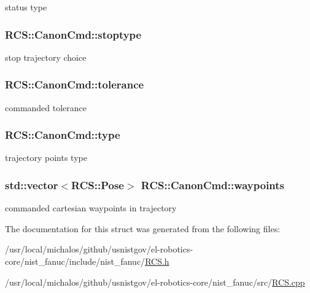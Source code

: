 status type \hypertarget{structRCS_1_1CanonCmd_a22bc418b884c7afabf0a2d3538f74cad}{
\subsubsection[{stoptype}]{ R\-C\-S\-::\-Canon\-Cmd\-::stoptype}}\label{structRCS_1_1CanonCmd_a22bc418b884c7afabf0a2d3538f74cad}
stop trajectory choice \hypertarget{structRCS_1_1CanonCmd_a0ae62df775329f52054c5cb25d0845a9}{
\subsubsection[{tolerance}]{ R\-C\-S\-::\-Canon\-Cmd\-::tolerance}}\label{structRCS_1_1CanonCmd_a0ae62df775329f52054c5cb25d0845a9}
commanded tolerance \hypertarget{structRCS_1_1CanonCmd_abf1d51c90a3f1b4c5796292c53cbde01}{
\subsubsection[{type}]{ R\-C\-S\-::\-Canon\-Cmd\-::type}}\label{structRCS_1_1CanonCmd_abf1d51c90a3f1b4c5796292c53cbde01}
trajectory points type \hypertarget{structRCS_1_1CanonCmd_a1f7fdffabe34bcb3f0afd42f60040648}{
\subsubsection[{waypoints}]{\setlength{\rightskip}{0pt plus 5cm}std\-::vector$<${\bf R\-C\-S\-::\-Pose}$>$ R\-C\-S\-::\-Canon\-Cmd\-::waypoints}}\label{structRCS_1_1CanonCmd_a1f7fdffabe34bcb3f0afd42f60040648}
commanded cartesian waypoints in trajectory 

The documentation for this struct was generated from the following files\-:\begin{DoxyCompactItemize}
\item 
/usr/local/michalos/github/usnistgov/el-\/robotics-\/core/nist\-\_\-fanuc/include/nist\-\_\-fanuc/\hyperlink{RCS_8h}{R\-C\-S.\-h}\item 
/usr/local/michalos/github/usnistgov/el-\/robotics-\/core/nist\-\_\-fanuc/src/\hyperlink{RCS_8cpp}{R\-C\-S.\-cpp}\end{DoxyCompactItemize}
